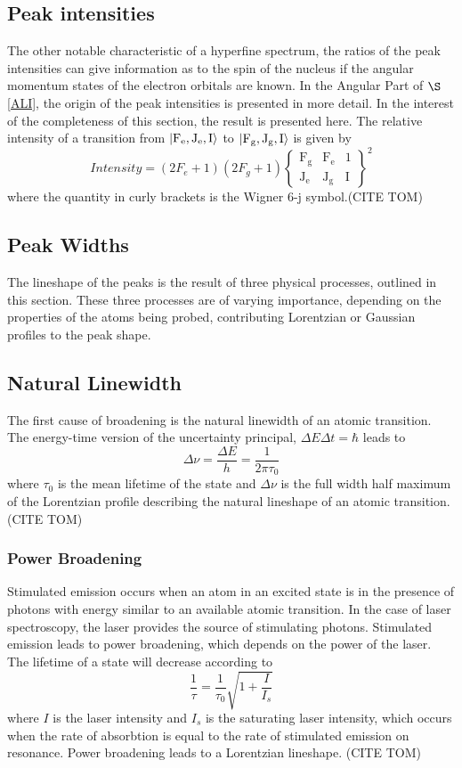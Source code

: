\subsection{Peak intensities} 
The other notable characteristic of a hyperfine spectrum, the ratios of the peak intensities can give information as to the spin of the nucleus if the angular momentum states of the electron orbitals are known. In the Angular Part of $\S$ \ref{ALI}, the origin of the peak intensities is presented in more detail. In the interest of the completeness of this section, the result is presented here. The relative intensity of a transition from $\ket{\mathrm{F_e,J_e,I}}$ to $\ket{\mathrm{F_g,J_g,I}}$ is given by
\begin{equation}
Intensity = (2F_e+1)(2F_g+1)
\left\lbrace
\mathrm{
\begin{matrix}
F_g & F_e & 1\\
J_e & J_g & I 
\end{matrix}
}
\right\rbrace^2
\end{equation}
where the quantity in curly brackets is the Wigner 6-j symbol.(CITE TOM)
\subsection{Peak Widths}
The lineshape of the peaks is the result of three physical processes, outlined in this section. These three processes are of varying importance, depending on the properties of the atoms being probed, contributing Lorentzian or Gaussian profiles to the peak shape. 

\subsection*{Natural Linewidth}
The first cause of broadening is the natural linewidth of an atomic transition. The energy-time version of the uncertainty principal, $\Delta E \Delta t= \hbar$ leads to 
\begin{equation}
\Delta \nu = \frac{\Delta E}{h}=\frac{1}{2 \pi \tau_0}
\end{equation}
where $\tau_0$ is the mean lifetime of the state and $\Delta \nu$ is the full width half maximum of the Lorentzian profile describing the natural lineshape of an atomic transition.(CITE TOM)

\subsubsection*{Power Broadening}
Stimulated emission occurs when an atom in an excited state is in the presence of photons with energy similar to an available atomic transition. In the case of laser spectroscopy, the laser provides the source of stimulating photons. Stimulated emission leads to power broadening, which depends on the power of the laser. The lifetime of a state will decrease according to
\begin{equation}
\frac{1}{\tau}= \frac{1}{\tau_0}\sqrt{1+\frac{I}{I_s}}
\end{equation}
where $I$ is the laser intensity and $I_s$ is the saturating laser intensity, which occurs when the rate of absorbtion is equal to the rate of stimulated emission on resonance. Power broadening leads to a Lorentzian lineshape. (CITE TOM)
